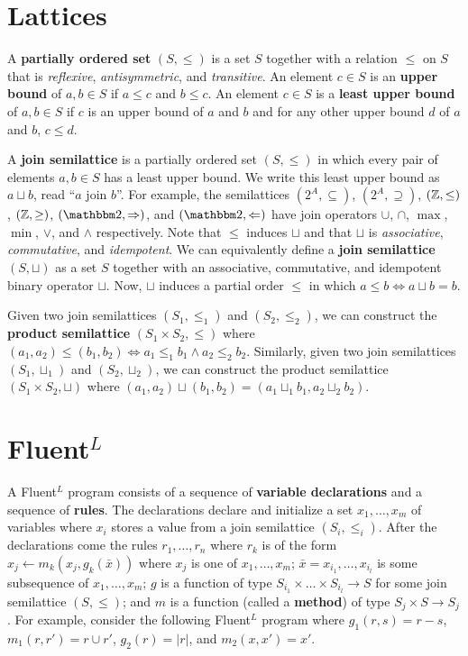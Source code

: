 \documentclass{mwhittaker}
\title{\fluentl}
\author{\ }
\date{\ }
\newcommand{\join}{\sqcup}
\newcommand{\fluentl}{Fluent$^L$}
\begin{document}
\maketitle

\section{Lattices}
A \textbf{partially ordered set} $(S, \leq)$ is a set $S$ together with a
relation $\leq$ on $S$ that is \textit{reflexive}, \textit{antisymmetric}, and
\textit{transitive}. An element $c \in S$ is an \textbf{upper bound} of $a, b
\in S$ if $a \leq c$ and $b \leq c$. An element $c \in S$ is a \textbf{least
upper bound} of $a, b \in S$ if $c$ is an upper bound of $a$ and $b$ and for
any other upper bound $d$ of $a$ and $b$, $c \leq d$.

A \textbf{join semilattice} is a partially ordered set $(S, \leq)$ in which
every pair of elements $a, b \in S$ has a least upper bound. We write this
least upper bound as $a \join b$, read ``$a$ join $b$''. For example, the
semilattices $(2^A, \subseteq)$, $(2^A, \supseteq)$, $(\mathbb{Z}, \leq)$, $(\mathbb{Z},
\geq)$, $(\bools, \Rightarrow)$, and $(\bools, \Leftarrow)$ have join operators
$\cup$, $\cap$, $\max$, $\min$, $\lor$, and $\land$ respectively. Note that
$\leq$ induces $\join$ and that $\join$ is \textit{associative},
\textit{commutative}, and \textit{idempotent}.
%
We can equivalently define a \textbf{join semilattice} $(S, \join)$ as a set
$S$ together with an associative, commutative, and idempotent binary operator
$\join$. Now, $\join$ induces a partial order $\leq$ in which $a \leq b \iff a
\join b = b$.

Given two join semilattices $(S_1, \leq_1)$ and $(S_2, \leq_2)$, we can
construct the \textbf{product semilattice} $(S_1 \times S_2, \leq)$ where
$(a_1, a_2) \leq (b_1, b_2) \iff a_1 \leq_1 b_1 \land a_2 \leq_2 b_2$.
Similarly, given two join semilattices $(S_1, \join_1)$ and $(S_2, \join_2)$,
we can construct the product semilattice $(S_1 \times S_2, \join)$ where $(a_1,
a_2) \join (b_1, b_2) = (a_1 \join_1 b_1, a_2 \join_2 b_2)$.

\section{\fluentl}
A \fluentl{} program consists of a sequence of \textbf{variable declarations}
and a sequence of \textbf{rules}. The declarations declare and initialize a set
$x_1, \ldots, x_m$ of variables where $x_i$ stores a value from a join
semilattice $(S_i, \leq_i)$. After the declarations come the rules $r_1,
\ldots, r_n$ where $r_k$ is of the form $x_j \gets m_k(x_j, g_k(\bar{x}))$
where $x_j$ is one of $x_1, \ldots, x_m$; $\bar{x} = x_{i_1}, \ldots, x_{i_l}$
is some subsequence of $x_1, \ldots, x_m$; $g$ is a function of type $S_{i_1}
\times \ldots \times S_{i_l} \to S$ for some join semilattice $(S, \leq)$; and
$m$ is a function (called a \textbf{method}) of type $S_j \times S \to S_j$.
For example, consider the following \fluentl{} program where $g_1(r, s) = r -
s$, $m_1(r, r') = r \cup r'$, $g_2(r) = |r|$, and $m_2(x, x') = x'$.
\end{document}
